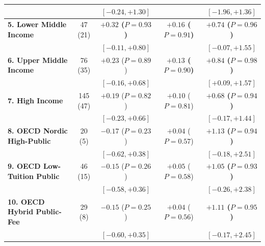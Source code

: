 \documentclass[11pt,a4paper]{article}
\newcommand{\co}{\cellcolor{colodd}}
\newcommand{\ce}{\cellcolor{coleven}}
\begin{document}
\begin{table}[htbp]
{\begin{tabular}{l|c|c|c|c}
    \rowcolor{roweven}
                                               & \ce & {\scriptsize $[-0.24, +1.30]$} & \ce {\scriptsize $[-0.12, +0.76]$} & {\scriptsize $[-1.96, +1.36]$} \\
    \hline
    \rowcolor{rowodd}
    \textbf{5. Lower Middle Income} & \co 47 (21) & \textbf{$+0.32$ ($P=0.93$)} & \co \textbf{$+0.16$ ($P=0.91$)} & \textbf{$+0.74$ ($P=0.96$)} \\
    \rowcolor{rowodd}
                                               & \co & {\scriptsize $[-0.11, +0.80]$} & \co {\scriptsize $[-0.09, +0.42]$} & {\scriptsize $[-0.07, +1.55]$} \\
    \hline
    \rowcolor{roweven}
    \textbf{6. Upper Middle Income} & \ce 76 (35) & $+0.23$ ($P=0.89$) & \ce \textbf{$+0.13$ ($P=0.90$)} & \textbf{$+0.84$ ($P=0.98$)} \\
    \rowcolor{roweven}
                                               & \ce & {\scriptsize $[-0.16, +0.68]$} & \ce {\scriptsize $[-0.08, +0.33]$} & {\scriptsize $[+0.09, +1.57]$} \\
    \hline
    \rowcolor{rowodd}
    \textbf{7. High Income} & \co 145 (47) & $+0.19$ ($P=0.82$) & \co $+0.10$ ($P=0.81$) & \textbf{$+0.68$ ($P=0.94$)} \\
    \rowcolor{rowodd}
                                               & \co & {\scriptsize $[-0.23, +0.66]$} & \co {\scriptsize $[-0.14, +0.31]$} & {\scriptsize $[-0.17, +1.44]$} \\
    \hline
    \rowcolor{roweven}
    \textbf{8. OECD Nordic High-Public} & \ce 20 (5) & $-0.17$ ($P=0.23$) & \ce $+0.04$ ($P=0.57$) & \textbf{$+1.13$ ($P=0.94$)} \\
    \rowcolor{roweven}
                                               & \ce & {\scriptsize $[-0.62, +0.38]$} & \ce {\scriptsize $[-0.34, +0.49]$} & {\scriptsize $[-0.18, +2.51]$} \\
    \hline
    \rowcolor{rowodd}
    \textbf{9. OECD Low-Tuition Public} & \co 46 (15) & $-0.15$ ($P=0.26$) & \co $+0.05$ ($P=0.58$) & \textbf{$+1.05$ ($P=0.93$)} \\
    \rowcolor{rowodd}
                                               & \co & {\scriptsize $[-0.58, +0.36]$} & \co {\scriptsize $[-0.33, +0.47]$} & {\scriptsize $[-0.26, +2.38]$} \\
    \hline
    \rowcolor{roweven}
    \textbf{10. OECD Hybrid Public-Fee} & \ce 29 (8) & $-0.15$ ($P=0.25$) & \ce $+0.04$ ($P=0.56$) & \textbf{$+1.11$ ($P=0.95$)} \\
    \rowcolor{roweven}
                                               & \ce & {\scriptsize $[-0.60, +0.35]$} & \ce {\scriptsize $[-0.33, +0.45]$} & {\scriptsize $[-0.17, +2.45]$} \\

\end{tabular}}
\end{table}
\end{document}
